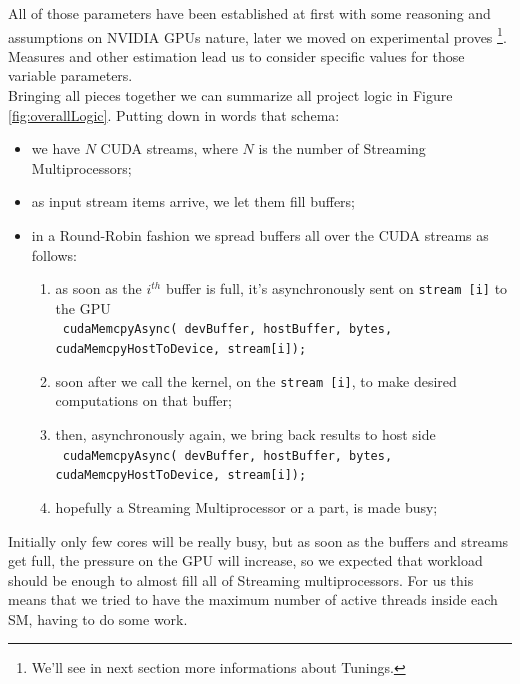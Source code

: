 	All of those parameters have been established at first with some reasoning and assumptions on NVIDIA GPUs nature, later we moved on experimental proves \footnote{We'll see in next section more informations about Tunings.}. Measures and other estimation lead us to consider specific values for those variable parameters.\\
	Bringing all pieces together we can summarize all project logic in Figure \ref{fig:overallLogic}.
	Putting down in words that schema:
	
	\begin{itemize}
		\item we have \(N\) CUDA streams, where \(N\) is the number of Streaming Multiprocessors;
		\item as input stream items arrive, we let them fill buffers;
		
		\item in a Round-Robin fashion we spread buffers all over the CUDA streams as follows:
		\begin{enumerate}
			\item as soon as the \(i^{th}\) buffer is full, it's asynchronously sent on \texttt{stream [i]} to the GPU \\ 
			\texttt{ cudaMemcpyAsync( devBuffer, hostBuffer, bytes, \\ \tab \tab \tab \tab cudaMemcpyHostToDevice, stream[i]);}
			
			\item soon after we call the kernel, on the \texttt{stream [i]}, to make desired computations on that buffer;
			
			\item then, asynchronously again, we bring back results to host side \\
			\texttt{ cudaMemcpyAsync( devBuffer, hostBuffer, bytes,\\ \tab \tab \tab \tab
			 cudaMemcpyHostToDevice, stream[i]);}
			\item hopefully a Streaming Multiprocessor or a part, is made busy;
		\end{enumerate}
		
		
	\end{itemize}
	
	Initially only few cores will be really busy, but as soon as the buffers and streams get full, the pressure on the GPU will increase, so we expected that workload should be enough to almost fill all of Streaming multiprocessors.
	For us this means that we tried to have the maximum number of active threads inside each SM, having to do some work.\\
	



